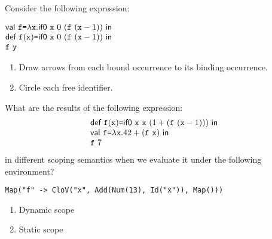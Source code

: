 \begin{exercise}

  Consider the following expression:

$
\begin{array}{@{}l@{}}
  \ebind{\cf}{\efun{\cx}{\eifz{\cx}{0}{(\eapp{\cf}{(\esub{\cx}{1})})}}}{ \\
  \erec{\cf}{\cx}{\eifz{\cx}{0}{(\eapp{\cf}{(\esub{\cx}{1})})}}{ \\
  \eapp{\cf}{\cy}
  }
  }
\end{array}
$

\begin{enumerate}
  \item Draw arrows from each bound occurrence to its binding occurrence.
  \item Circle each free identifier.
\end{enumerate}

\end{exercise}

\begin{exercise}

What are the results of the following expression:
\[
  \begin{array}{l}
  \textsf{def}\ \texttt{f}(\texttt{x})\texttt{=}\textsf{if0}\ \texttt{x}\ \texttt{x}\ (1+(\texttt{f}\ (\texttt{x}-1)))\ \textsf{in}\ \\
  \textsf{val}\ \texttt{f}\texttt{=}\lambda\texttt{x}.42+(\texttt{f}\ \texttt{x})\ \textsf{in}\ \\
  \texttt{f}\ 7
 
 
  \end{array}
\]
in different scoping semantics when we evaluate it under the following environment?
\begin{verbatim}
Map("f" -> CloV("x", Add(Num(13), Id("x")), Map()))
\end{verbatim}

\begin{enumerate}
  \item Dynamic scope
  \item Static scope
\end{enumerate}

\end{exercise}


